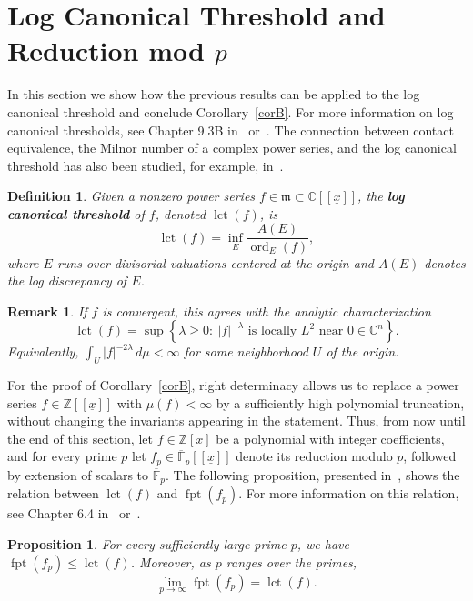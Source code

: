 \documentclass{article}
\newtheorem{definition}[theorem]{Definition}
\newtheorem{proposition}[theorem]{Proposition}
\newtheorem{remark}[theorem]{Remark}
\DeclareMathOperator{\ord}{ord}
\DeclareMathOperator{\fpt}{fpt}
\DeclareMathOperator{\lct}{lct}
\numberwithin{theorem}{section}
\begin{document}
\section{Log Canonical Threshold and Reduction mod $p$}

In this section we show how the previous results can be applied to the log canonical threshold and conclude Corollary~\ref{corB}. For more information on log canonical thresholds, see Chapter 9.3B in~\cite{lazarsfeld2003positivity} or~\cite{kollar2008powers,blum2016log}. The connection between contact equivalence, the Milnor number of a complex power series, and the log canonical threshold has also been studied, for example, in~\cite{almiron2022limit,cluckers2022log,mustactua2026some}.

\begin{definition}\label{def:lct}
Given a nonzero power series $f\in\mathfrak{m}\subset\mathbb{C}[[\underline{x}]]$, the \textbf{log canonical threshold} of $f$, denoted $\lct(f)$, is
\[
    \lct(f)=\inf_E\frac{A(E)}{\ord_E(f)},
\]
where $E$ runs over divisorial valuations centered at the origin and $A(E)$ denotes the log discrepancy of $E$.
\end{definition}

\begin{remark}
\textup{If $f$ is convergent, this agrees with the analytic characterization
\[
\lct(f)=\sup\left\{\lambda\geq0:\ |f|^{-\lambda}\text{ is locally }L^2
\text{ near }0\in\mathbb{C}^n\right\}.
\]
Equivalently, $\int_U |f|^{-2\lambda}\,d\mu<\infty$ for some neighborhood $U$ of the origin.}
\end{remark}


For the proof of Corollary~\ref{corB}, right determinacy allows us to replace a power series $f\in\mathbb{Z}[[\underline{x}]]$ with $\mu(f)<\infty$ by a sufficiently high polynomial truncation, without changing the invariants appearing in the statement. Thus, from now until the end of this section, let $f\in\mathbb{Z}[\underline{x}]$ be a polynomial with integer coefficients, and for every prime $p$ let $f_p\in\overline{\mathbb{F}}_p[[\underline{x}]]$ denote its reduction modulo $p$, followed by extension of scalars to $\overline{\mathbb{F}}_p$. The following proposition, presented in~\cite{hara2003generalization}, shows the relation between $\lct(f)$ and $\fpt(f_p)$. For more information on this relation, see Chapter 6.4 in~\cite{schwede2024singularities} or~\cite{mustata2012impanga}.

\begin{proposition}\label{prop:lct_fpt}
For every sufficiently large prime $p$, we have $\fpt(f_p)\leq\lct(f)$. Moreover, as $p$ ranges over the primes,
\[
    \lim_{p\to\infty}\fpt(f_p)=\lct(f).
\]
\end{proposition}
\end{document}
